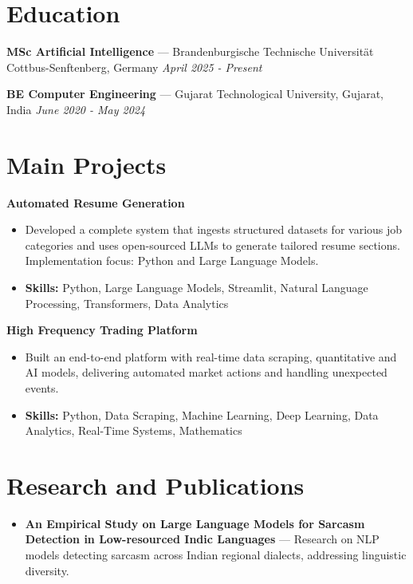 \documentclass[a4paper,10pt]{article}
\begin{document}
\section*{Education}
\textbf{MSc Artificial Intelligence} — Brandenburgische Technische Universität Cottbus-Senftenberg, Germany \hfill \textit{April 2025 - Present}\par
\vspace{1.5pt}
\textbf{BE Computer Engineering} — Gujarat Technological University, Gujarat, India \hfill \textit{June 2020 - May 2024}\par

\section*{Main Projects}
\textbf{Automated Resume Generation}\par
\vspace{1pt}
\begin{itemize}
  \item Developed a complete system that ingests structured datasets for various job categories and uses open-sourced LLMs to generate tailored resume sections. Implementation focus: Python and Large Language Models.
  \item \textbf{Skills:} Python, Large Language Models, Streamlit, Natural Language Processing, Transformers, Data Analytics
\end{itemize}
\vspace{3pt}
\textbf{High Frequency Trading Platform}\par
\vspace{1pt}
\begin{itemize}
  \item Built an end-to-end platform with real-time data scraping, quantitative and AI models, delivering automated market actions and handling unexpected events.
  \item \textbf{Skills:} Python, Data Scraping, Machine Learning, Deep Learning, Data Analytics, Real-Time Systems, Mathematics
\end{itemize}

\section*{Research and Publications}
\begin{itemize}
\item \textbf{An Empirical Study on Large Language Models for Sarcasm Detection in Low-resourced Indic Languages} — Research on NLP models detecting sarcasm across Indian regional dialects, addressing linguistic diversity.
\end{itemize}
\end{document}
